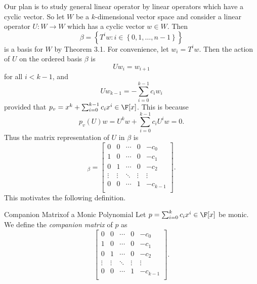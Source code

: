 \documentclass[math_245.tex]{subfiles}
\begin{document}
    \begin{remark}
        Our plan is to study general linear operator by linear operators which have a cyclic vector. So let $W$ be a $k$-dimensional vector space and consider a linear operator $U:W\to W$ which has a cyclic vector $w\in W$. Then
        \begin{equation*}
            \beta = \left\lbrace T^iw: i\in \left\lbrace 0,1,\ldots,n-1 \right\rbrace  \right\rbrace 
        \end{equation*}
        is a basis for $W$ by Theorem 3.1. For convenience, let $w_i = T^iw$. Then the action of $U$ on the ordered basis $\beta$ is
        \begin{equation*}
            Uw_i = w_{i+1}
        \end{equation*}
        for all $i<k-1$, and
        \begin{equation*}
            Uw_{k-1} = - \sum^{k-1}_{i=0} c_iw_i
        \end{equation*}
        provided that $p_v = x^k + \sum^{k-1}_{i=0} c_ix^i\in\F[x]$. This is because
        \begin{equation*}
            p_v(U)w = U^kw + \sum^{k-1}_{i=0} c_iU^iw = 0.
        \end{equation*}
        Thus the matrix representation of $U$ in $\beta$ is
        \begin{equation*}
            [U]_\beta = 
            \begin{bmatrix}
                0 & 0 & \cdots & 0 & -c_0 \\
                1 & 0 & \cdots & 0 & -c_1 \\
                0 & 1 & \cdots & 0 & -c_2 \\
                \vdots & \vdots & \ddots  & \vdots & \vdots \\
                0 & 0 & \cdots & 1 & -c_{k-1} \\
            \end{bmatrix}.
        \end{equation*}
        This motivates the following definition.
    \end{remark}

    \begin{definition}{Companion Matrix}{of a Monic Polynomial}
        Let $p = \sum^{k}_{i=0} c_ix^i\in\F[x]$ be monic. We define the \emph{companion matrix} of $p$ as
        \begin{equation*}
            \begin{bmatrix}
                0 & 0 & \cdots & 0 & -c_0 \\
                1 & 0 & \cdots & 0 & -c_1 \\
                0 & 1 & \cdots & 0 & -c_2 \\
                \vdots & \vdots & \ddots  & \vdots & \vdots \\
                0 & 0 & \cdots & 1 & -c_{k-1} \\
            \end{bmatrix}.
        \end{equation*}
    \end{definition}
\end{document}
